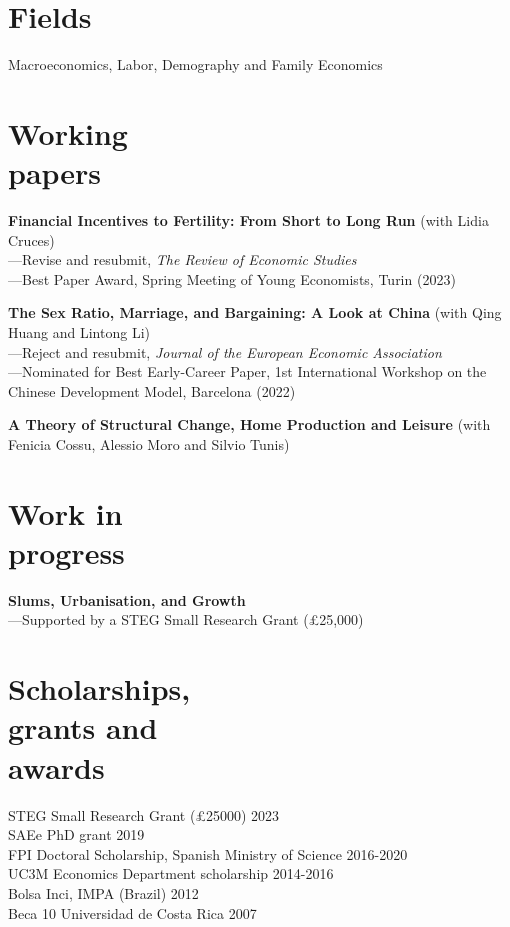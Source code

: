 \documentclass[margin]{res} %
\begin{document}
\begin{resume}
\section{Fields}

Macroeconomics, Labor, Demography and Family Economics

\section{Working \\ papers}
{\bf Financial Incentives to Fertility: From Short to Long Run} (with Lidia Cruces) \\
---Revise and resubmit, {\sl The Review of Economic Studies} \\
---Best Paper Award, Spring Meeting of Young Economists, Turin (2023)

{\bf The Sex Ratio, Marriage, and Bargaining: A Look at China} (with Qing Huang and Lintong Li) \\
---Reject and resubmit, {\sl Journal of the European Economic Association} \\
---Nominated for Best Early-Career Paper, 1st International Workshop on the Chinese Development Model, Barcelona (2022) 

{\bf A Theory of Structural Change, Home Production and Leisure} (with Fenicia Cossu, Alessio Moro and Silvio Tunis) 

\section{Work in \\ progress}
{\bf Slums, Urbanisation, and Growth} \\
---Supported by a STEG Small Research Grant (£25,000)


\section{Scholarships, \\ grants and \\ awards} 

STEG Small Research Grant (£25000) \hfill 2023 \\
SAEe PhD grant \hfill 2019\\
FPI Doctoral Scholarship, Spanish Ministry of Science \hfill 2016-2020 \\
UC3M Economics Department scholarship \hfill 2014-2016 \\
Bolsa Inci, IMPA (Brazil) \hfill 2012 \\
Beca 10 Universidad de Costa Rica \hfill 2007


\end{resume}
\end{document}
